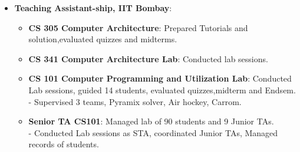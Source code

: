 \begin{itemize}
	\item \textbf{Teaching Assistant-ship, IIT Bombay}: \hfill \\[-0.6cm]
	\begin{itemize}
		\item \textbf{CS 305 Computer Architecture}: Prepared Tutorials and solution,evaluated quizzes and midterms. 
		\item \textbf{CS 341 Computer Architecture Lab}: Conducted lab sessions. 
		\item \textbf{CS 101 Computer Programming and Utilization Lab}:
Conducted Lab sessions, guided 14 students, evaluated quizzes,midterm and Endsem.
- Supervised 3 teams, Pyramix solver, Air hockey, Carrom.
  \item \textbf{Senior TA CS101}:  
  Managed lab of 90 students and 9 Junior TAs.\\
- Conducted Lab sessions as STA, coordinated Junior TAs, Managed records of students.   
	\end{itemize}
\end{itemize}
